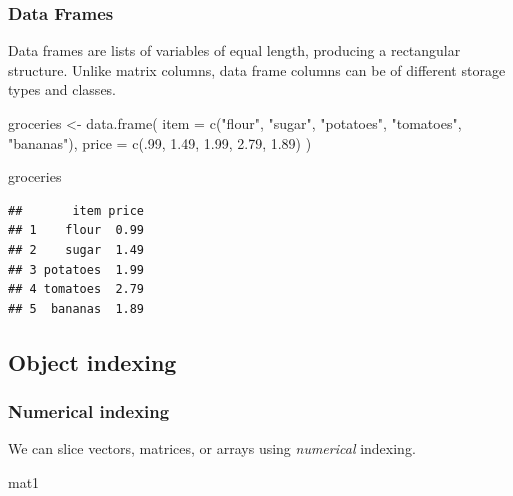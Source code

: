 \documentclass[
  11pt,
]{article}
\newenvironment{Shaded}{\begin{snugshade}}{\end{snugshade}}
\newcommand{\AttributeTok}[1]{\textcolor[rgb]{0.77,0.63,0.00}{#1}}
\newcommand{\DecValTok}[1]{\textcolor[rgb]{0.00,0.00,0.81}{#1}}
\newcommand{\FloatTok}[1]{\textcolor[rgb]{0.00,0.00,0.81}{#1}}
\newcommand{\FunctionTok}[1]{\textcolor[rgb]{0.00,0.00,0.00}{#1}}
\newcommand{\NormalTok}[1]{#1}
\newcommand{\OtherTok}[1]{\textcolor[rgb]{0.56,0.35,0.01}{#1}}
\newcommand{\StringTok}[1]{\textcolor[rgb]{0.31,0.60,0.02}{#1}}
\begin{document}
\hypertarget{data-frames}{%
\subsubsection{Data Frames}\label{data-frames}}

Data frames are lists of variables of equal length, producing a
rectangular structure. Unlike matrix columns, data frame columns can be of
different storage types and classes.

\begin{Shaded}
\begin{Highlighting}[]
\NormalTok{groceries }\OtherTok{\textless{}{-}} \FunctionTok{data.frame}\NormalTok{(}
  \AttributeTok{item =} \FunctionTok{c}\NormalTok{(}\StringTok{"flour"}\NormalTok{, }\StringTok{"sugar"}\NormalTok{, }\StringTok{"potatoes"}\NormalTok{, }\StringTok{"tomatoes"}\NormalTok{, }\StringTok{"bananas"}\NormalTok{),}
  \AttributeTok{price =} \FunctionTok{c}\NormalTok{(.}\DecValTok{99}\NormalTok{, }\FloatTok{1.49}\NormalTok{, }\FloatTok{1.99}\NormalTok{, }\FloatTok{2.79}\NormalTok{, }\FloatTok{1.89}\NormalTok{)}
\NormalTok{)}

\NormalTok{groceries}
\end{Highlighting}
\end{Shaded}

\begin{verbatim}
##       item price
## 1    flour  0.99
## 2    sugar  1.49
## 3 potatoes  1.99
## 4 tomatoes  2.79
## 5  bananas  1.89
\end{verbatim}

\hypertarget{object-indexing}{%
\subsection{Object indexing}\label{object-indexing}}

\hypertarget{numerical-indexing}{%
\subsubsection{Numerical indexing}\label{numerical-indexing}}

We can slice vectors, matrices, or arrays using \emph{numerical} indexing.

\begin{Shaded}
\begin{Highlighting}[]
\NormalTok{mat1}
\end{Highlighting}
\end{Shaded}
\end{document}

